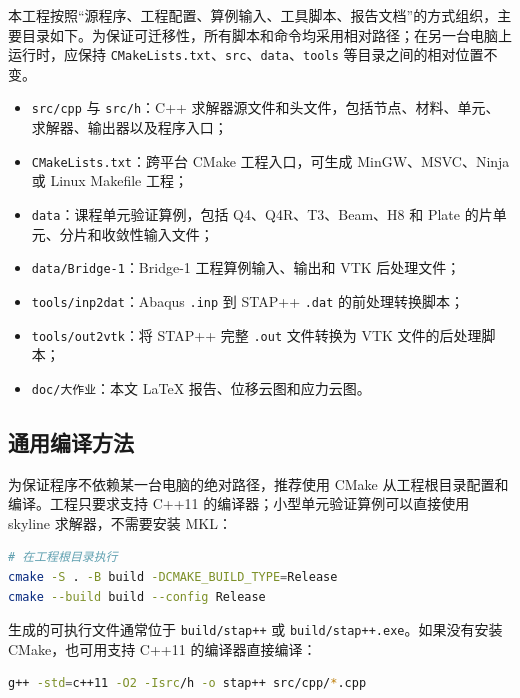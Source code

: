 \documentclass[UTF8,a4paper,zihao=-4]{ctexart}
\begin{document}
本工程按照“源程序、工程配置、算例输入、工具脚本、报告文档”的方式组织，主要目录如下。为保证可迁移性，所有脚本和命令均采用相对路径；在另一台电脑上运行时，应保持 \texttt{CMakeLists.txt}、\texttt{src}、\texttt{data}、\texttt{tools} 等目录之间的相对位置不变。
\begin{itemize}
    \item \texttt{src/cpp} 与 \texttt{src/h}：C++ 求解器源文件和头文件，包括节点、材料、单元、求解器、输出器以及程序入口；
    \item \texttt{CMakeLists.txt}：跨平台 CMake 工程入口，可生成 MinGW、MSVC、Ninja 或 Linux Makefile 工程；
    \item \texttt{data}：课程单元验证算例，包括 Q4、Q4R、T3、Beam、H8 和 Plate 的片单元、分片和收敛性输入文件；
    \item \texttt{data/Bridge-1}：Bridge-1 工程算例输入、输出和 VTK 后处理文件；
    \item \texttt{tools/inp2dat}：Abaqus \texttt{.inp} 到 STAP++ \texttt{.dat} 的前处理转换脚本；
    \item \texttt{tools/out2vtk}：将 STAP++ 完整 \texttt{.out} 文件转换为 VTK 文件的后处理脚本；
    \item \texttt{doc/大作业}：本文 LaTeX 报告、位移云图和应力云图。
\end{itemize}

\subsection{通用编译方法}

为保证程序不依赖某一台电脑的绝对路径，推荐使用 CMake 从工程根目录配置和编译。工程只要求支持 C++11 的编译器；小型单元验证算例可以直接使用 skyline 求解器，不需要安装 MKL：
\begin{lstlisting}[language=bash,caption={通用 CMake 编译流程}]
# 在工程根目录执行
cmake -S . -B build -DCMAKE_BUILD_TYPE=Release
cmake --build build --config Release
\end{lstlisting}

生成的可执行文件通常位于 \texttt{build/stap++} 或 \texttt{build/stap++.exe}。如果没有安装 CMake，也可用支持 C++11 的编译器直接编译：
\begin{lstlisting}[language=bash,caption={直接使用 C++ 编译器编译}]
g++ -std=c++11 -O2 -Isrc/h -o stap++ src/cpp/*.cpp
\end{lstlisting}
\end{document}
